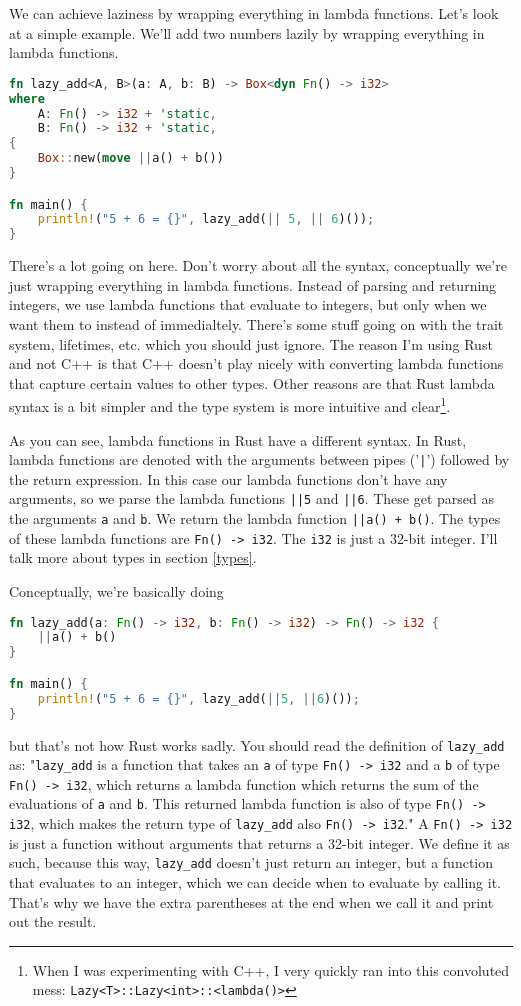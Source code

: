 \documentclass[11pt]{article}
\begin{document}
We can achieve laziness by wrapping everything in lambda functions. Let's look
at a simple example. We'll add two numbers lazily by wrapping everything in
lambda functions.

\begin{lstlisting}[language=Rust]
fn lazy_add<A, B>(a: A, b: B) -> Box<dyn Fn() -> i32>
where
    A: Fn() -> i32 + 'static,
    B: Fn() -> i32 + 'static,
{
    Box::new(move ||a() + b())
}

fn main() {
    println!("5 + 6 = {}", lazy_add(|| 5, || 6)());
}
\end{lstlisting}

There's a lot going on here. Don't worry about all the syntax, conceptually
we're just wrapping everything in lambda functions. Instead of parsing and
returning integers, we use lambda functions that evaluate to integers, but only
when we want them to instead of immedialtely. There's some stuff going on with
the trait system, lifetimes, etc. which you should just ignore. The reason I'm
using Rust and not C++ is that C++ doesn't play nicely with converting lambda
functions that capture certain values to other types. Other reasons are that
Rust lambda syntax is a bit simpler and the type system is more intuitive and
clear\footnote{When I was experimenting with C++, I very quickly ran into this
convoluted mess: \texttt{Lazy<T>::Lazy<int>::<lambda()>}}.

As you can see, lambda functions in Rust have a different syntax. In Rust,
lambda functions are denoted with the arguments between pipes ('\texttt{|}')
followed by the return expression. In this case our lambda functions don't have
any arguments, so we parse the lambda functions \texttt{||5} and \texttt{||6}.
These get parsed as the arguments \texttt{a} and \texttt{b}. We return the
lambda function \texttt{||a() + b()}. The types of these lambda functions are
\texttt{Fn()\ ->\ i32}. The \texttt{i32} is just a 32-bit integer. I'll talk
more about types in section \ref{types}.

Conceptually, we're basically doing
\begin{lstlisting}[language=Rust]
fn lazy_add(a: Fn() -> i32, b: Fn() -> i32) -> Fn() -> i32 {
    ||a() + b()
}

fn main() {
    println!("5 + 6 = {}", lazy_add(||5, ||6)());
}
\end{lstlisting}

but that's not how Rust works sadly. You should read the definition of
\texttt{lazy\_add} as: "\texttt{lazy\_add} is a function that takes an
\texttt{a} of type \texttt{Fn() -> i32} and a \texttt{b} of type \texttt{Fn()
-> i32}, which returns a lambda function which returns the sum of the
evaluations of \texttt{a} and \texttt{b}. This returned lambda function is also
of type \texttt{Fn() -> i32}, which makes the return type of \texttt{lazy\_add}
also \texttt{Fn() -> i32}." A \texttt{Fn() -> i32} is just a function without
arguments that returns a 32-bit integer. We define it as such, because this
way, \texttt{lazy\_add} doesn't just return an integer, but a function that
evaluates to an integer, which we can decide when to evaluate by calling it.
That's why we have the extra parentheses at the end when we call it and print
out the result.
\end{document}
